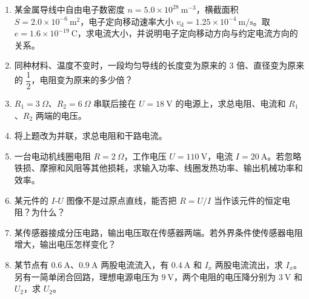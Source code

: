 \begin{enumerate}
  \item 某金属导线中自由电子数密度
  $n=5.0\times10^{28}\ \mathrm{m^{-3}}$，横截面积
  $S=2.0\times10^{-6}\ \mathrm{m^2}$，电子定向移动速率大小
  $v_{\mathrm d}=1.25\times10^{-4}\ \mathrm{m/s}$。取
  $e=1.6\times10^{-19}\ \mathrm C$，求电流大小，并说明电子定向移动方向与约定电流方向的关系。

  \item 同种材料、温度不变时，一段均匀导线的长度变为原来的 $3$ 倍、直径变为原来的 $\dfrac12$，电阻变为原来的多少倍？

  \item $R_1 = 3\ \Omega$、$R_2 = 6\ \Omega$ 串联后接在 $U = 18\ \mathrm{V}$ 的电源上，求总电阻、电流和 $R_1$、$R_2$ 两端的电压。

  \item 将上题改为并联，求总电阻和干路电流。
  \begin{center}
  
  \end{center}

  \item 一台电动机线圈电阻 $R = 2\ \Omega$，工作电压
  $U = 110\ \mathrm{V}$，电流 $I = 20\ \mathrm{A}$。若忽略铁损、摩擦和风阻等其他损耗，求输入功率、线圈发热功率、输出机械功率和效率。
  \begin{center}
  
  \end{center}

  \item 某元件的 $I$-$U$ 图像不是过原点直线，能否把 $R=U/I$ 当作该元件的恒定电阻？为什么？

  \item 某传感器接成分压电路，输出电压取在传感器两端。若外界条件使传感器电阻增大，输出电压怎样变化？

  \item 某节点有 $0.6\ \mathrm A$、$0.9\ \mathrm A$ 两股电流流入，有 $0.4\ \mathrm A$ 和 $I_x$ 两股电流流出，求 $I_x$。另有一简单闭合回路，理想电源电压为 $9\ \mathrm V$，两个电阻的电压降分别为 $3\ \mathrm V$ 和 $U_2$，求 $U_2$。
\end{enumerate}

